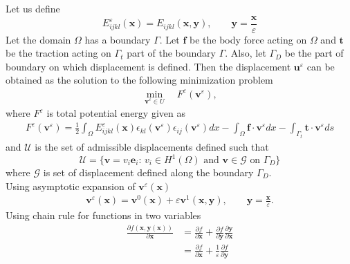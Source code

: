 \documentclass[openright,twoside]{iitkthesis}
\newcommand{\e}[1]{\textbf{#1}}
\begin{document}
Let us define
\begin{equation}
E_{ijkl}^\varepsilon (\textbf{x}) = E_{ijkl}(\textbf{x},\textbf{y}), \qquad \textbf{y} = \frac{\textbf{x}}{\varepsilon}
\end{equation}
Let the domain $\Omega$ has a boundary $\Gamma$. Let $\textbf{f}$ be the body force acting on $\Omega$ and $\textbf{t}$ be the traction acting on $\Gamma_t$ part of the boundary $\Gamma$. Also, let $\Gamma_D$ be the part of boundary on which displacement is defined. Then the displacement $\textbf{u}^\varepsilon$ can be obtained as the solution to the following minimization problem
\begin{align}
\label{fem}
\min_{\textbf{v}^\varepsilon\in U} \quad F^\varepsilon(\textbf{v}^\varepsilon),
\end{align} 
where $F^\varepsilon$ is total potential energy given as    
\begin{eqnarray} \label{tpe}
F^\varepsilon(\textbf{v}^\varepsilon) = \frac{1}{2}\int_\Omega E^\varepsilon_{ijkl}(\e x)\epsilon_{kl}(\textbf{v}^\varepsilon)\epsilon_{ij}(\textbf{v}^\varepsilon)dx-\int_\Omega\textbf{f}\cdot\textbf{v}^\varepsilon dx - \int_{\Gamma_t}\textbf{t}\cdot\textbf{v}^\varepsilon ds
\end{eqnarray}
and $\mathcal{U}$ is the set of admissible displacements defined such that
\begin{equation}
\mathcal{U} = \{\textbf{v} = v_i\textbf{e}_i :\, v_i\in H^1(\Omega) \text{ and } \textbf{v}\in\mathcal{G} \text{ on } \Gamma_D\}
\end{equation}
where $\mathcal{G}$ is set of displacement defined along the boundary $\Gamma_D$.\\
Using asymptotic expansion of $\e v^\varepsilon(\e x)$
\begin{align}
\textbf{v}^\varepsilon(\textbf{x}) = \textbf{v}^0(\textbf{x})+\varepsilon\textbf{v}^1(\textbf{x},\textbf{y}),\qquad \textbf{y}=\frac{\textbf{x}}{\varepsilon}.
\end{align}
Using chain rule for functions in two variables\\
\begin{equation}
\begin{split}
\frac{\partial f(\e x, \e y(\e x))}{\partial \textbf{x}} &= \frac{\partial f}{\partial \textbf{x}}+\frac{\partial f}{\partial \textbf{y}}\frac{\partial \textbf{y}}{\partial \textbf{x}}\\
&=\frac{\partial f}{\partial \textbf{x}}+\frac{1}{\varepsilon}\frac{\partial f}{\partial \textbf{y}}
\end{split}
\end{equation}
\end{document}
